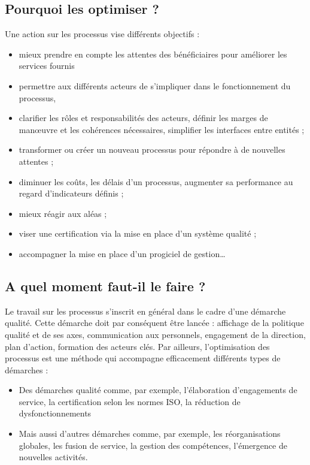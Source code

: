 	\subsection{Pourquoi les optimiser ?\cite{Ref21}}
Une action sur les processus vise différents objectifs : 

\begin{itemize}[label=\textbullet, font=\LARGE \color{blue}]
	\item mieux prendre en compte les attentes des bénéficiaires pour améliorer les services fournis 
	\item permettre aux différents acteurs de s'impliquer dans le fonctionnement du processus,
	\item clarifier les rôles et responsabilités des acteurs, définir les marges de manœuvre et les cohérences nécessaires, simplifier les interfaces entre entités ; 
	\item transformer ou créer un nouveau processus pour répondre à de nouvelles attentes ;
	\item diminuer les coûts, les délais d'un processus, augmenter sa performance au regard d'indicateurs définis ; 
	\item mieux réagir aux aléas ; 
	\item viser une certification via la mise en place d'un système qualité ;
	\item accompagner la mise en place d'un progiciel de gestion… 
\end{itemize} 
	\subsection{A quel moment faut-il le faire ?}
Le travail sur les processus s'inscrit en général dans le cadre d'une démarche qualité. Cette démarche doit par conséquent être lancée : affichage de la politique qualité\cite{Ref9} et de ses axes, communication aux personnels, engagement de la direction, plan d'action, formation des acteurs clés.
Par ailleurs, l'optimisation des processus est une méthode qui accompagne efficacement différents types de démarches : 

\begin{itemize}[label=\textbullet, font=\LARGE \color{blue}]
	\item Des démarches qualité comme, par exemple, l’élaboration d’engagements de service, la certification selon les normes ISO, la réduction de dysfonctionnements 
	\item Mais aussi d’autres démarches comme, par exemple, les réorganisations globales, les fusion de service, la gestion des compétences, l’émergence de nouvelles activités.
\end{itemize} 

